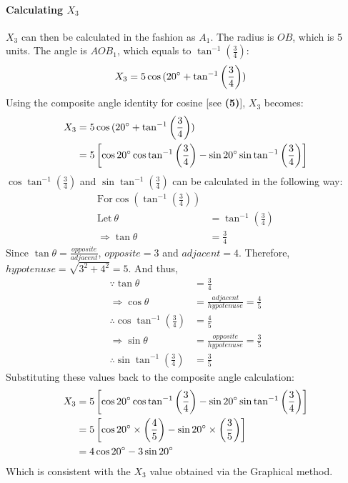 \documentclass{article}
\begin{document}
            \paragraph{Calculating $X_3$} $X_3$ can then be calculated in the fashion as $A_1$. The radius is $OB$, which is 5 units. The angle is $AOB_1$, which equals to $\tan^{-1}{\left(\frac{3}{4}\right)}$:
            \begin{align*}
                X_3 &= 5\cos{(20\degree + \tan^{-1}{\left(\frac{3}{4}\right))}}
            \end{align*}
            Using the composite angle identity for cosine [see \textbf{(5)}], $X_3$ becomes:
            \begin{align*}
                X_3 &= 5\cos{(20\degree + \tan^{-1}{\left(\frac{3}{4}\right)})} \\
                &= 5\left[\cos{20\degree}\cos{\tan^{-1}{\left(\frac{3}{4}\right)}} - \sin{20\degree}\sin{\tan^{-1}{\left(\frac{3}{4}\right)}}\right]
            \end{align*}
            $\cos{\tan^{-1}{\left(\frac{3}{4}\right)}}$ and $\sin{\tan^{-1}{\left(\frac{3}{4}\right)}}$ can be calculated in the following way:
            \begin{align*}
                \mathrm{For} \cos{\left( \tan^{-1}{\left(\frac{3}{4}\right)}\right) } \\
                \mathrm{Let \ } \theta &= \tan^{-1}{\left(\frac{3}{4}\right)} \\
                \Rightarrow \tan{\theta} &= \frac{3}{4}
            \end{align*}
            Since $\tan{\theta} = \frac{opposite}{adjacent}$, $opposite = 3$ and $adjacent = 4$. Therefore, $hypotenuse = \sqrt{3^2 + 4^2} = 5$. And thus,
            \begin{align*}
                \because \tan{\theta} &= \frac{3}{4} \\
                \Rightarrow \cos{\theta} &= \frac{adjacent}{hypotenuse} = \frac{4}{5} \\
                \therefore \cos{\tan^{-1}{\left(\frac{3}{4}\right)}} &= \frac{4}{5} \\
                \Rightarrow \sin{\theta} &= \frac{opposite}{hypotenuse} = \frac{3}{5} \\
                \therefore \sin{\tan^{-1}{\left(\frac{3}{4}\right)}} &= \frac{3}{5}
            \end{align*}
            Substituting these values back to the composite angle calculation:
            \begin{align*}
                X_3 &= 5\left[\cos{20\degree}\cos{\tan^{-1}{\left(\frac{3}{4}\right)}} - \sin{20\degree}\sin{\tan^{-1}{\left(\frac{3}{4}\right)}}\right] \\
                &= 5\left[\cos{20\degree}\times \left( \frac{4}{5}\right)  - \sin{20\degree} \times \left( \frac{3}{5}\right)   \right] \\
                &= 4\cos{20\degree} - 3\sin{20\degree}
            \end{align*}
            Which is consistent with the $X_3$ value obtained via the Graphical method.
\end{document}
